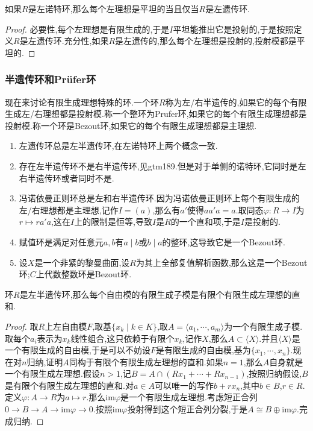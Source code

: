 如果$R$是左诺特环,那么每个左理想是平坦的当且仅当$R$是左遗传环.
\begin{proof}
	
	必要性,每个左理想是有限生成的,于是$I$平坦能推出它是投射的,于是按照定义$R$是左遗传环.充分性,如果$R$是左遗传的,那么每个左理想是投射的,投射模都是平坦的.
\end{proof}


\subsubsection{半遗传环和Pr\"ufer环}



现在来讨论有限生成理想特殊的环.一个环$R$称为左/右半遗传的,如果它的每个有限生成左/右理想都是投射模.称一个整环为Prufer环,如果它的每个有限生成理想都是投射模.称一个环是Bezout环,如果它的每个有限生成理想都是主理想.
\begin{enumerate}
	\item 左遗传环总是左半遗传环,在左诺特环上两个概念一致.
	\item 存在左半遗传环不是右半遗传环,见gtm189.但是对于单侧的诺特环,它同时是左右半遗传环或者同时不是.
	\item 冯诺依曼正则环总是左和右半遗传环.因为冯诺依曼正则环上每个有限生成的左/右理想都是主理想,记作$I=(a)$,那么有$a'$使得$aa'a=a$.取同态$\varphi:R\to I$为$r\mapsto ra'a$,这在$I$上的限制是恒等,导致$I$是$R$的一个直和项,于是$I$是投射的.
	\item 赋值环是满足对任意元$a,b$有$a\mid b$或$b\mid a$的整环,这导致它是一个Bezout环.
	\item 设$X$是一个非紧的黎曼曲面,设$R$为其上全部复值解析函数,那么这是一个Bezout环;$C$上代数整数环是Bezout环.
\end{enumerate}

环$R$是左半遗传环,那么每个自由模的有限生成子模是有限个有限生成左理想的直和.
\begin{proof}
	
	取$R$上左自由模$F$,取基$\{x_k\mid k\in K\}$,取$A=\langle a_1,\cdots,a_m\rangle$为一个有限生成子模.取每个$a_i$表示为$x_k$线性组合,这只依赖于有限个$x_k$,记作$X$,那么$A\subset \langle X\rangle$.并且$\langle X\rangle$是一个有限生成的自由模,于是可以不妨设$F$是有限生成的自由模,基为$\{x_1,\cdots,x_n\}$.现在对$n$归纳,证明$A$同构于有限个有限生成左理想的直和.如果$n=1$,那么$A$自身就是一个有限生成左理想.假设$n>1$,记$B=A\cap(Rx_1+\cdots+Rx_{n-1})$,按照归纳假设,$B$是有限个有限生成左理想的直和.对$a\in A$可以唯一的写作$b+rx_n$,其中$b\in B$,$r\in R$.定义$\varphi:A\to R$为$a\mapsto r$.那么$\mathrm{im}\varphi$是一个有限生成左理想.考虑短正合列$0\to B\to A\to\mathrm{im}\varphi\to0$.按照$\mathrm{im}\varphi$投射得到这个短正合列分裂,于是$A\cong B\oplus\mathrm{im}\varphi$.完成归纳.
\end{proof}


